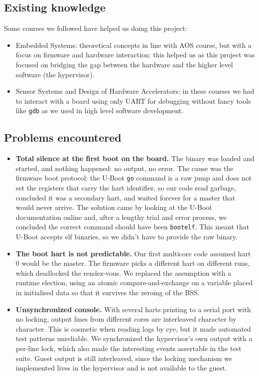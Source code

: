 \documentclass[10pt,a4]{article}
\begin{document}
\subsection{Existing knowledge}

Some courses we followed have helped us doing this project:
\begin{itemize}
  \item Embedded Systems: theoretical concepts in line with AOS course, but with a focus on 
  firmware and hardware interaction: this helped us as this project was focused on bridging the gap
  between the hardware and the higher level software (the hypervisor).
  \item Sensor Systems and Design of Hardware Accelerators: in these courses we had to interact 
  with a board using only UART for debugging without fancy tools like \texttt{gdb} as we used in high level
  software development.
\end{itemize}

\subsection{Problems encountered}

\begin{itemize}
\item \textbf{Total silence at the first boot on the board.} The binary was
  loaded and started, and nothing happened: no output, no error. The cause was
  the firmware boot protocol: the U-Boot \texttt{go} command is a raw jump and
  does not set the registers that carry the hart identifier, so our code read
  garbage, concluded it was a secondary hart, and waited forever for a master
  that would never arrive. The solution came by looking at the U-Boot documentation online
  and, after a lengthy trial and error process, we concluded the correct command should have 
  been \texttt{bootelf}. This meant that U-Boot accepts elf binaries, so
  we didn't have to provide the raw binary.

\item \textbf{The boot hart is not predictable.} Our first multicore code
  assumed hart 0 would be the master. The firmware picks a different hart on
  different runs, which deadlocked the rendez-vous. We replaced the assumption
  with a runtime election, using an atomic compare-and-exchange on a variable
  placed in initialised data so that it survives the zeroing of the BSS.

\item \textbf{Unsynchronized console.} With several harts printing to a serial
  port with no locking, output lines from different cores are interleaved
  character by character. This is cosmetic when reading logs by eye, but it made
  automated test patterns unreliable. We synchronized the hypervisor's own output with a per-line
  lock, which also made the interesting events assertable in the test suite.
  Guest output is still interleaved, since the locking mechanism we implemented lives
  in the hypervisor and is not available to the guest.
\end{itemize}
\end{document}

